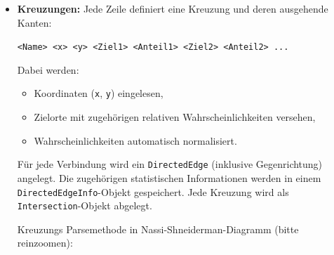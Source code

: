 \begin{itemize}
\clearpage

  \item \textbf{Kreuzungen:} Jede Zeile definiert eine Kreuzung und deren ausgehende Kanten:
  \begin{center}
    \texttt{<Name> <x> <y> <Ziel1> <Anteil1> <Ziel2> <Anteil2> ...}
  \end{center}
  Dabei werden:
  \begin{itemize}
    \item Koordinaten (\texttt{x}, \texttt{y}) eingelesen,
    \item Zielorte mit zugehörigen relativen Wahrscheinlichkeiten versehen,
    \item Wahrscheinlichkeiten automatisch normalisiert.
  \end{itemize}
Für jede Verbindung wird ein \texttt{DirectedEdge} (inklusive Gegenrichtung) angelegt.
Die zugehörigen statistischen Informationen werden in einem \texttt{DirectedEdgeInfo}-Objekt gespeichert.
Jede Kreuzung wird als \texttt{Intersection}-Objekt abgelegt.

Kreuzungs Parsemethode in Nassi-Shneiderman-Diagramm (bitte reinzoomen):
  \vspace{-4.5cm}
\end{itemize}
\FloatBarrier
\begin{figure}[h!]
    \vspace{-1.5cm} 
    \centering
\end{figure}


